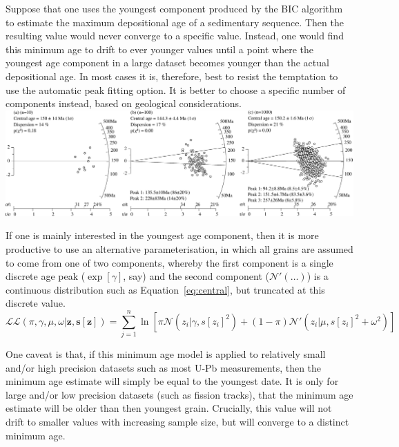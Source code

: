 \begin{refsection}
Suppose that one uses the youngest component produced by the BIC
algorithm to estimate the maximum depositional age of a sedimentary
sequence. Then the resulting value would never converge to a specific
value.  Instead, one would find this minimum age to drift to ever
younger values until a point where the youngest age component in a
large dataset becomes younger than the actual depositional age. In
most cases it is, therefore, best to resist the temptation to use the
automatic peak fitting option. It is better to choose a specific
number of components instead, based on geological considerations.\\

\noindent\includegraphics[width=\textwidth]{../figures/increasingn.pdf}
\begingroup {}
\label{fig:increasingn}
\endgroup

If one is mainly interested in the youngest age component, then it is
more productive to use an alternative parameterisation, in which all
grains are assumed to come from one of two components, whereby the
first component is a single discrete age peak ($\exp[\gamma]$, say)
and the second component ($\mathcal{N}'(\ldots)$) is a continuous
distribution such as Equation~\ref{eq:central}, but truncated at this
discrete value.
\begin{equation}
  \mathcal{LL}(\pi,\gamma,\mu,\omega|\mathbf{z},\mathbf{s[z]}) =
  \sum\limits_{j=1}^{n} \ln\!\left[
    \pi \mathcal{N}(z_i|\gamma,s[z_i]^2) +
    (1-\pi) \mathcal{N}'(z_i|\mu,s[z_i]^2+\omega^2)
    \right]
\label{eq:Lminagemod}
\end{equation}

One caveat is that, if this minimum age model is applied to relatively
small and/or high precision datasets such as most U-Pb measurements,
then the minimum age estimate will simply be equal to the youngest
date.  It is only for large and/or low precision datasets (such as
fission tracks), that the minimum age estimate will be older than then
youngest grain.  Crucially, this value will not drift to smaller
values with increasing sample size, but will converge to a distinct
minimum age.\\


\end{refsection}
